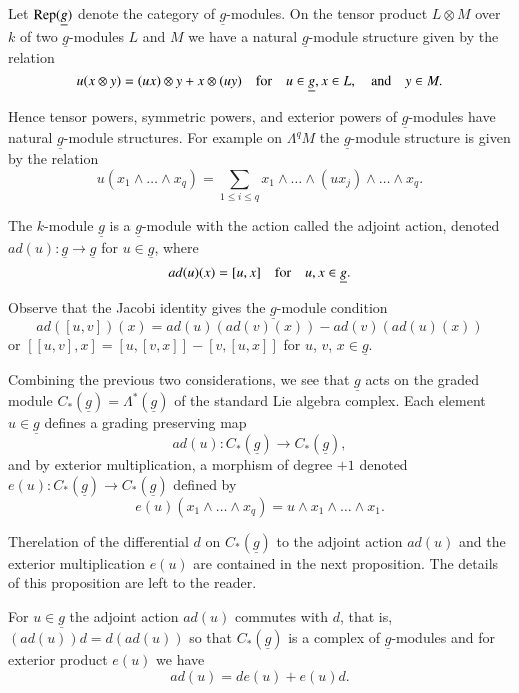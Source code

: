 \begin{notation}\label{chap4-not3.1}
Let $\operatorname{Rep}(\underline{g})$ denote the category of
$\underline{g}$-modules. On the tensor product $L\otimes M$ over $k$
of two $\underline{g}$-modules $L$ and $M$ we have a natural
$\underline{g}$-module structure given by the relation
$$
u(x\otimes y)=(ux)\otimes y+x\otimes(uy)\quad\text{for}\quad u\in
\underline{g}, x\in L,\quad\text{and}\quad y\in M.
$$

Hence tensor powers, symmetric powers, and exterior powers of
$\underline{g}$-modules have natural $\underline{g}$-module
structures. For example on $\Lambda^{q}M$ the $\underline{g}$-module
structure is given by the relation
$$
u(x_{1}\wedge\ldots\wedge x_{q})=\sum_{1\leq i\leq
  q}x_{1}\wedge\ldots\wedge (ux_{j})\wedge\ldots\wedge x_{q}.
$$
\end{notation}

\begin{example}\label{chap4-exam3.2}
The $k$-module $\underline{g}$ is a $\underline{g}$-module with the
action called the adjoint action, denoted $ad(u):\underline{g}\to
\underline{g}$ for $u\in \underline{g}$, where
$$
ad(u)(x)=[u,x]\quad\text{for}\quad u,x\in \underline{g}.
$$

Observe that the Jacobi identity gives the $\underline{g}$-module
condition 
$$
ad([u,v])(x)=ad(u)(ad(v)(x))-ad(v)(ad(u)(x))
$$
or $[[u,v],x]=[u,[v,x]]-[v,[u,x]]$ for $u$, $v$, $x\in \underline{g}$.
\end{example}

Combining the previous two considerations, we see that $\underline{g}$
acts on the graded module
$C_{\ast}(\underline{g})=\Lambda^{*}(\underline{g})$ of the standard
Lie algebra complex. Each element $u\in\underline{g}$ defines a
grading preserving map 
$$
ad(u):C_{\ast}(\underline{g})\to C_{\ast}(\underline{g}),
$$
and by exterior multiplication, a morphism of degree $+1$ denoted
$e(u):C_{\ast}(\underline{g})\to C_{\ast}(\underline{g})$ defined by
$$
e(u)(x_{1}\wedge\ldots\wedge x_{q})=u\wedge x_{1}\wedge\ldots\wedge
x_{1}.
$$

The\pageoriginale relation of the differential $d$ on
$C_{\ast}(\underline{g})$ to the adjoint action $ad(u)$ and the
exterior multiplication $e(u)$ are contained in the next
proposition. The details of this proposition are left to the reader.

\begin{proposition}\label{chap4-prop3.3}
For $u\in \underline{g}$ the adjoint action $ad(u)$ commutes with $d$,
that is, $(ad(u))d=d(ad(u))$ so that $C_{\ast}(\underline{g})$ is a
complex of $\underline{g}$-modules and for exterior product $e(u)$ we
have
\begin{equation*}
ad(u)=de(u)+e(u)d.\tag{*}
\end{equation*}
\end{proposition}


